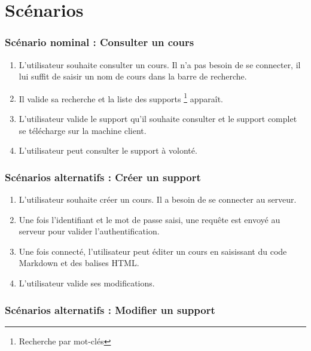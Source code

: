 \section{Scénarios}

\subsubsection{Scénario nominal : Consulter un cours}
    \begin{enumerate}
    
        \item L'utilisateur souhaite consulter un cours. Il n'a pas besoin de se connecter, il lui suffit de saisir un nom de cours dans la barre de recherche.
        \item Il valide sa recherche et la liste des supports \footnote{Recherche par mot-clés} apparaît.
        \item L'utilisateur valide le support qu'il souhaite consulter et le support complet se télécharge sur la machine client.
        \item L'utilisateur peut consulter le support à volonté.
        
    \end{enumerate}


\subsubsection{Scénarios alternatifs : Créer un support}
    
    \begin{enumerate}

        \item L'utilisateur souhaite créer un cours. Il a besoin de se connecter au serveur.
        \item Une fois l'identifiant et le mot de passe saisi, une requête est envoyé au serveur pour valider l'authentification.
        \item Une fois connecté, l'utilisateur peut éditer un cours en saisissant du code Markdown et des balises HTML.
        \item L'utilisateur valide ses modifications.
        
    \end{enumerate}
        
\subsubsection{Scénarios alternatifs : Modifier  un support}

